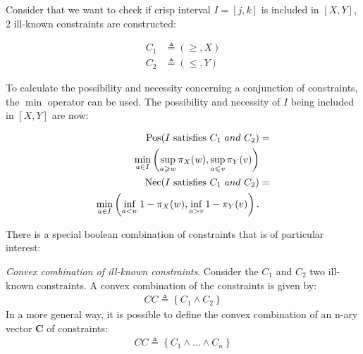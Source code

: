 \begin{example}
Consider that we want to check if crisp interval $I = \left[j, k\right]$ is included in $\left[X, Y\right]$, 2 ill-known constraints are constructed:


\vspace{-10pt}

\begin{eqnarray}
C_1 & \triangleq\left(\geq,X\right)\\
C_2 & \triangleq\left(\leq,Y\right)
\end{eqnarray}

To calculate the possibility and necessity concerning a conjunction of constraints, the $\min$ operator can be used. The possibility and necessity of $I$ being included in $\left[X, Y\right]$ are now: %

\vspace{-10pt}

\begin{align}
\label{eq:interval-pos}
\operatorname{Pos}(I\text{ satisfies }C_1\ and\ C_2) & =\\
\nonumber
\min_{a \in I}\left(\sup_{a \geqslant w}\pi_{X}(w),\sup_{a \leqslant v}\pi_{Y}(v)\right)\\
\label{eq:interval-nec}
\operatorname{Nec}(I\text{ satisfies }C_1\ and\ C_2) & =\\
\nonumber
\min_{a \in I}\left(\inf_{a < w} 1-\pi_{X}(w),\inf_{a > v} 1-\pi_{Y}(v)\right).
\end{align}
\end{example}

There is a special boolean combination of constraints that is of particular interest:
\begin{definition}
\emph{Convex combination of ill-known constraints}. Consider the $C_1$ and $C_2$ two ill-known constraints. A convex combination of the constraints is given by:
\begin{align}
\label{eq:convex-combination}
CC \triangleq \left \lbrace C_1 \wedge C_2 \right \rbrace
\end{align}
In a more general way, it is possible to define the convex combination of an n-ary vector  $\mathbf{C}$ of constraints:
\begin{align}
\label{eq:nary-convex-combination}
CC \triangleq \left \lbrace C_1 \wedge \ldots \wedge C_n \right \rbrace
\end{align}
\end{definition}

